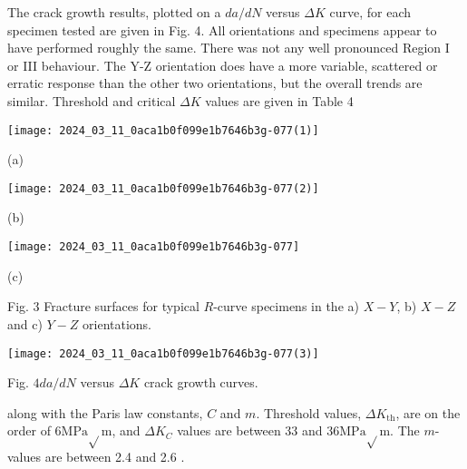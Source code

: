 \documentclass[10pt]{article}
\begin{document}
The crack growth results, plotted on a $d a / d N$ versus $\Delta K$ curve, for each specimen tested are given in Fig. 4. All orientations and specimens appear to have performed roughly the same. There was not any well pronounced Region I or III behaviour. The Y-Z orientation does have a more variable, scattered or erratic response than the other two orientations, but the overall trends are similar. Threshold and critical $\Delta K$ values are given in Table 4

\begin{center}
\texttt{[image: 2024\_03\_11\_0aca1b0f099e1b7646b3g-077(1)]}
\end{center}

(a)

\begin{center}
\texttt{[image: 2024\_03\_11\_0aca1b0f099e1b7646b3g-077(2)]}
\end{center}

(b)

\begin{center}
\texttt{[image: 2024\_03\_11\_0aca1b0f099e1b7646b3g-077]}
\end{center}

(c)

Fig. 3 Fracture surfaces for typical $R$-curve specimens in the a) $X-Y$, b) $X-Z$ and c) $Y-Z$ orientations.

\begin{center}
\texttt{[image: 2024\_03\_11\_0aca1b0f099e1b7646b3g-077(3)]}
\end{center}

Fig. $4 d a / d N$ versus $\Delta K$ crack growth curves.

along with the Paris law constants, $C$ and $m$. Threshold values, $\Delta K_{\mathrm{th}}$, are on the order of $6 \mathrm{MPa} \sqrt{ } \mathrm{m}$, and $\Delta K_{C}$ values are between 33 and $36 \mathrm{MPa} \sqrt{ } \mathrm{m}$. The $m$-values are between 2.4 and 2.6 .
\end{document}
